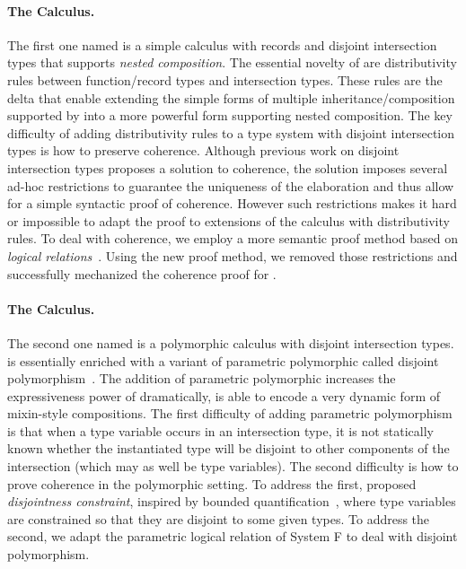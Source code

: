 \paragraph{The \namee Calculus.}

The first one named \namee is a simple calculus with records and disjoint
intersection types that supports \emph{nested composition}. The essential
novelty of \namee are distributivity rules between function/record types and
intersection types. These rules are the delta that enable extending the simple
forms of multiple inheritance/composition supported by \oname into a more
powerful form supporting nested composition. The key difficulty of adding
distributivity rules to a type system with disjoint intersection types is how to
preserve coherence. Although previous work on disjoint intersection types
proposes a solution to coherence, the solution imposes several ad-hoc
restrictions to guarantee the uniqueness of the elaboration and thus allow for a
simple syntactic proof of coherence. However such restrictions makes it hard or
impossible to adapt the proof to extensions of the calculus with distributivity
rules. To deal with coherence, we employ a more semantic proof method based on
\emph{logical relations}~\citep{tait, plotkin1973lambda, statman1985logical}.
Using the new proof method, we removed those restrictions and successfully
mechanized the coherence proof for \namee.

\paragraph{The \fnamee Calculus.}

The second one named \fnamee is a polymorphic calculus with disjoint
intersection types. \fnamee is essentially \namee enriched with a variant of
parametric polymorphic called disjoint polymorphism~\citep{alpuimdisjoint}. The
addition of parametric polymorphic increases the expressiveness power of \namee
dramatically, \fnamee is able to encode a very dynamic form of mixin-style
compositions. The first difficulty of adding parametric polymorphism is that
when a type variable occurs in an intersection type, it is not statically known
whether the instantiated type will be disjoint to other components of the
intersection (which may as well be type variables). The second difficulty is how
to prove coherence in the polymorphic setting. To address the first, \citet{alpuimdisjoint}
proposed \textit{disjointness constraint}, inspired by bounded
quantification~\citep{cardelli1994extension}, where type variables are constrained so that they are disjoint
to some given types. To address the second, we adapt the parametric logical
relation of System F to deal with disjoint polymorphism.



